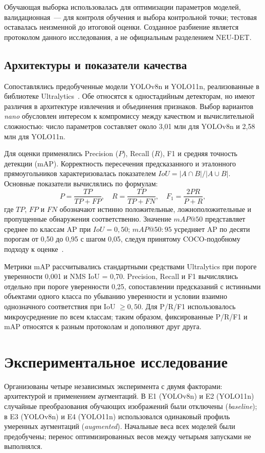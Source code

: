 \documentclass{misisarticle}
\begin{document}


Обучающая выборка использовалась для оптимизации параметров моделей, валидационная~--- для контроля обучения и выбора контрольной точки; тестовая оставалась неизменной до итоговой оценки. Созданное разбиение является протоколом данного исследования, а не официальным разделением NEU-DET.

\subsection{Архитектуры и показатели качества}
Сопоставлялись предобученные модели YOLOv8n и YOLO11n, реализованные в библиотеке Ultralytics~\cite{jocher2023,jocher2024}. Обе относятся к одностадийным детекторам, но имеют различия в архитектуре извлечения и объединения признаков. Выбор вариантов \textit{nano} обусловлен интересом к компромиссу между качеством и вычислительной сложностью: число параметров составляет около 3,01 млн для YOLOv8n и 2,58 млн для YOLO11n.

Для оценки применялись Precision ($P$), Recall ($R$), F1 и средняя точность детекции (mAP). Корректность пересечения предсказанного и эталонного прямоугольников характеризовалась показателем $IoU=|A\cap B|/|A\cup B|$. Основные показатели вычислялись по формулам:
\begin{equation}
 P=\frac{TP}{TP+FP},\quad R=\frac{TP}{TP+FN},\quad F_1=\frac{2PR}{P+R},
\label{eq:prf}
\end{equation}
где $TP$, $FP$ и $FN$ обозначают истинно положительные, ложноположительные и пропущенные обнаружения соответственно. Значение $mAP@50$ представляет среднее по классам AP при $IoU=0{,}50$; $mAP@50{:}95$ усредняет AP по десяти порогам от 0,50 до 0,95 с шагом 0,05, следуя принятому COCO-подобному подходу к оценке~\cite{lin2014}.

Метрики mAP рассчитывались стандартными средствами Ultralytics при пороге уверенности 0,001 и NMS IoU = 0,70. Precision, Recall и F1 вычислялись отдельно при пороге уверенности 0,25, сопоставлении предсказаний с истинными объектами одного класса по убыванию уверенности и условии взаимно однозначного соответствия при IoU $\geq0{,}50$. Для P/R/F1 использовалось микроусреднение по всем классам; таким образом, фиксированные P/R/F1 и mAP относятся к разным протоколам и дополняют друг друга.

\section{Экспериментальное исследование}
Организованы четыре независимых эксперимента с двумя факторами: архитектурой и применением аугментаций. В E1 (YOLOv8n) и E2 (YOLO11n) случайные преобразования обучающих изображений были отключены (\textit{baseline}); в E3 (YOLOv8n) и E4 (YOLO11n) использовался одинаковый профиль умеренных аугментаций (\textit{augmented}). Начальные веса всех моделей были предобучены; перенос оптимизированных весов между четырьмя запусками не выполнялся.
\end{document}
